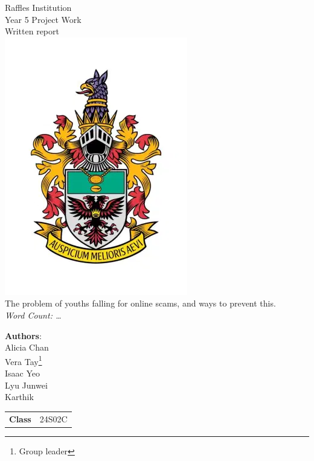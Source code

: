 \documentclass[a4paper]{article}
\begin{document}
\begin{titlepage}
  \Centering{}
  \Large{Raffles Institution \\ Year 5 Project Work \\ Written report} \\
  \includegraphics[scale=0.5]{ri-school-crest.png} \\
  \huge{The problem of youths falling for online scams, and ways to prevent this.} \\
  \vspace{0.5cm}
  \small{\emph{Word Count: \ldots}} \\
  \vspace{0.5cm} \large{
    \textbf{Authors}: \\
    Alicia Chan \\
    Vera Tay\footnote{Group leader} \\
    Isaac Yeo \\
    Lyu Junwei \\
    Karthik \\
    \vspace{1cm}
    \begin{tabular}{r@{:}l}
      \textbf{Class} & \hspace{1cm} 24S02C \\
    \end{tabular}

  }
\end{titlepage}

\newpage
\end{document}
